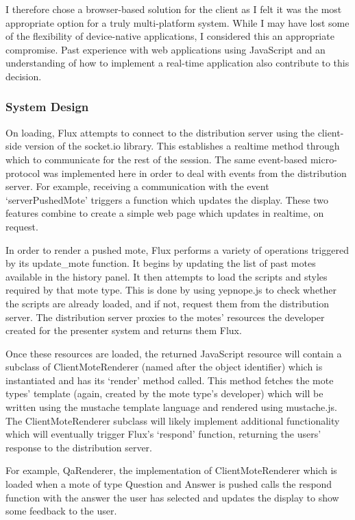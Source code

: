 \documentclass[a4papert,11pt,notitlepage]{ltxdoc}
\begin{document}
I therefore chose a browser-based solution for the client as I felt it was the most appropriate option for a truly multi-platform system. While I may have lost some of the flexibility of device-native applications, I considered this an appropriate compromise. Past experience with web applications using JavaScript and an understanding of how to implement a real-time application also contribute to this decision.


\subsubsection{System Design}
On loading, Flux attempts to connect to the distribution server using the client-side version of the socket.io library. This establishes a realtime method through which to communicate for the rest of the session. The same event-based micro-protocol was implemented here in order to deal with events from the distribution server. For example, receiving a communication with the event `serverPushedMote' triggers a function which updates the display. These two features combine to create a simple web page which updates in realtime, on request.

In order to render a pushed mote, Flux performs a variety of operations triggered by its update\_mote function. It begins by updating the list of past motes available in the history panel. It then attempts to load the scripts and styles required by that mote type. This is done by using yepnope.js\cite{yepnope:web} to check whether the scripts are already loaded, and if not, request them from the distribution server. The distribution server proxies to the motes' resources the developer created for the presenter system and returns them Flux.

Once these resources are loaded, the returned JavaScript resource will contain a subclass of ClientMoteRenderer (named after the object identifier) which is instantiated and has its `render' method called. This method fetches the mote types' template (again, created by the mote type's developer) which will be written using the mustache\cite{mustache:web} template language and rendered using mustache.js\cite{mustachejs:web}. The ClientMoteRenderer subclass will likely implement additional functionality which will eventually trigger Flux's `respond' function, returning the users' response to the distribution server.

For example, QaRenderer, the implementation of ClientMoteRenderer which is loaded when a mote of type Question and Answer is pushed calls the respond function with the answer the user has selected and updates the display to show some feedback to the user.
\end{document}
